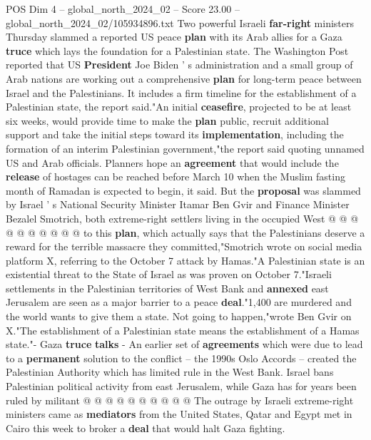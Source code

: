 \begin{textsample}{POS Dim 4 – global\_north\_2024\_02 – Score 23.00 – global\_north\_2024\_02/105934896.txt}  \label{ex:f4_pos_188}
Two powerful Israeli \textbf{far-right} ministers Thursday slammed a reported US peace \textbf{plan} with its Arab allies for a Gaza \textbf{truce} which lays the foundation for a Palestinian state.
The Washington Post reported that US \textbf{President} Joe Biden ' s administration and a small group of Arab nations are working out a comprehensive \textbf{plan} for long-term peace between Israel and the Palestinians.
It includes a firm timeline for the establishment of a Palestinian state, the report said."An initial \textbf{ceasefire}, projected to be at least six weeks, would provide time to make the \textbf{plan} public, recruit additional support and take the initial steps toward its \textbf{implementation}, including the formation of an interim Palestinian government,"the report said quoting unnamed US and Arab officials.
Planners hope an \textbf{agreement} that would include the \textbf{release} of hostages can be reached before March 10 when the Muslim fasting month of Ramadan is expected to begin, it said.
But the \textbf{proposal} was slammed by Israel ' s National Security Minister Itamar Ben Gvir and Finance Minister Bezalel Smotrich, both extreme-right settlers living in the occupied West @ @ @ @ @ @ @ @ @ @ to this \textbf{plan}, which actually says that the Palestinians deserve a reward for the terrible massacre they committed,"Smotrich wrote on social media platform X, referring to the October 7 attack by Hamas."A Palestinian state is an existential threat to the State of Israel as was proven on October 7."Israeli settlements in the Palestinian territories of West Bank and \textbf{annexed} east Jerusalem are seen as a major barrier to a peace \textbf{deal}."1,400 are murdered and the world wants to give them a state.
Not going to happen,"wrote Ben Gvir on X."The establishment of a Palestinian state means the establishment of a Hamas state."- Gaza \textbf{truce} \textbf{talks} - An earlier set of \textbf{agreements} which were due to lead to a \textbf{permanent} solution to the conflict -- the 1990s Oslo Accords -- created the Palestinian Authority which has limited rule in the West Bank.
Israel bans Palestinian political activity from east Jerusalem, while Gaza has for years been ruled by militant @ @ @ @ @ @ @ @ @ @ The outrage by Israeli extreme-right ministers came as \textbf{mediators} from the United States, Qatar and Egypt met in Cairo this week to broker a \textbf{deal} that would halt Gaza fighting.

\end{textsample}
